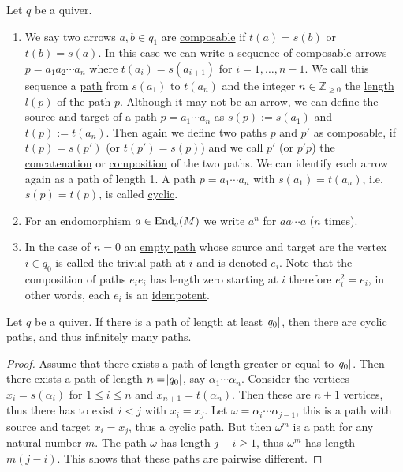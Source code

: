 \begin{definition}\label{def:path}
Let $q$ be a quiver.
\begin{enumerate}
\renewcommand{\labelenumi}{(\theenumi)}
\item We say two arrows $a, b \in q_{1}$ are \ul{composable} if $t(a) = s(b)$ or $t(b) = s(a)$. In this case we can write a
sequence of composable arrows $p = a_{1}a_{2}\cdots a_{n}$ where $t(a_{i}) = s(a_{i+1})$ for $i=1,\dots,n-1$.
We call this sequence a \ul{path} from $s(a_{1})$ to $t(a_{n})$ and the integer $n \in \mathbb{Z}_{\geq0}$ the \ul{length} $l(p)$ of the path $p$.
Although it may not be an arrow, we can define the source and target of a path $p = a_{1}\cdots a_{n}$ as $s(p) := s(a_{1})$ and $t(p) := t(a_{n})$.
Then again we define two paths $p$ and $p'$ as composable, if $t(p) = s(p')$ (or $t(p') = s(p)$) and we call $p'$ (or $p'p$) the
\ul{concatenation} or \ul{composition} of the two paths. We can identify each arrow again as a path of length 1.
A path $p = a_{1}\cdots a_{n}$ with $s(a_{1}) = t(a_{n})$, i.e. $s(p) = t(p)$, is called \ul{cyclic}.
\item For an endomorphism $a \in \textup{End}_{q}(M)$ we write $a^{n}$ for $aa \cdots a$ ($n$ times).
\item In the case of $n=0$ an \ul{empty path} whose source and target are the vertex $i \in q_{0}$ is called the \ul{trivial path at $i$} and
is denoted $e_{i}$. Note that the composition of paths $e_{i}e_{i}$ has length zero starting at $i$ therefore $e_{i}^{2}=e_{i}$,
in other words, each $e_{i}$ is an \ul{idempotent}.
\end{enumerate}
\end{definition}

\begin{lemma}\label{la:cyclic_paths}
Let $q$ be a quiver. If there is a path of length at least $\abs{q_{0}}$, then there are cyclic paths,
and thus infinitely many paths.\cite{[leit4]}
\end{lemma}
\begin{proof}
Assume that there exists a path of length greater or equal to $\abs{q_{0}}$. Then there exists a path of length $n = \abs{q_{0}}$, say
$\alpha_{1}\cdots \alpha_{n}$. Consider the vertices $x_{i}=s(\alpha_{i})$ for $1 \leq i \leq n$ and $x_{n+1}=t(\alpha_{n})$. Then these
are $n+1$ vertices, thus there has to exist $i<j$ with $x_{i}=x_{j}$. Let $\omega=\alpha_{i}\cdots \alpha_{j-1}$, this is a path with source and target
$x_{i}=x_{j}$, thus a cyclic path. But then $\omega^{m}$ is a path for any natural number $m$. The path $\omega$ has length $j-i\geq1$, thus
$\omega^{m}$ has length $m(j-i)$. This shows that these paths are pairwise different.
\end{proof}


